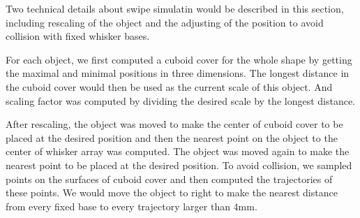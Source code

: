 Two technical details about swipe simulatin would be described in this section, including rescaling of the object and the adjusting of the position to avoid collision with fixed whisker bases.

For each object, we first computed a cuboid cover for the whole shape by getting the maximal and minimal positions in three dimensions. 
The longest distance in the cuboid cover would then be used as the current scale of this object. 
And scaling factor was computed by dividing the desired scale by the longest distance. 

After rescaling, the object was moved to make the center of cuboid cover to be placed at the desired position and then the nearest point on the object to the center of whisker array was computed.
The object was moved again to make the nearest point to be placed at the desired position.
To avoid collision, we sampled points on the surfaces of cuboid cover and then computed the trajectories of these points. 
We would move the object to right to make the nearest distance from every fixed base to every trajectory larger than 4mm.
